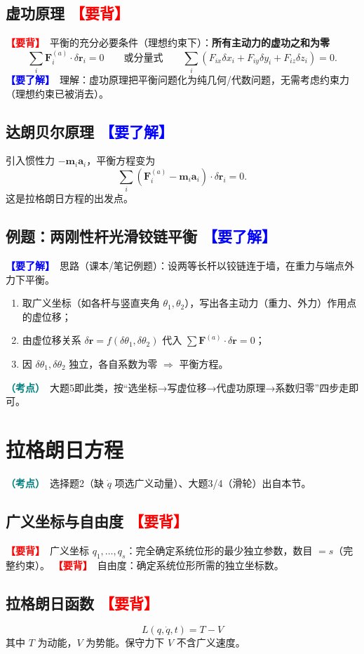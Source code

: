 \documentclass[UTF8,a4paper,11pt]{ctexart}
\newcommand{\bp}[1]{\textcolor{red}{\textbf{【要背】}}\ #1}
\newcommand{\uf}[1]{\textcolor{blue}{\textbf{【要了解】}}\ #1}
\newcommand{\imp}[1]{\textcolor{teal}{\textbf{（考点）}}\ #1}
\begin{document}
\subsection{虚功原理 \bp{}}
\bp{平衡的充分必要条件}（理想约束下）：\textbf{所有主动力的虚功之和为零}
\[
\boxed{\sum_i \bm F_i^{(a)}\cdot\delta\bm r_i=0}\qquad\text{或分量式}\qquad
\sum_i (F_{ix}\delta x_i+F_{iy}\delta y_i+F_{iz}\delta z_i)=0.
\]
\uf{理解}：虚功原理把平衡问题化为纯几何/代数问题，无需考虑约束力（理想约束已被消去）。

\subsection{达朗贝尔原理 \uf{}}
引入惯性力 $-\bm m_i\bm a_i$，平衡方程变为
\[
\sum_i (\bm F_i^{(a)}-\bm m_i\bm a_i)\cdot\delta\bm r_i=0.
\]
这是拉格朗日方程的出发点。

\subsection{例题：两刚性杆光滑铰链平衡 \uf{}}
\uf{思路}（课本/笔记例题）：设两等长杆以铰链连于墙，在重力与端点外力下平衡。
\begin{enumerate}[itemsep=2pt]
  \item 取广义坐标（如各杆与竖直夹角 $\theta_1,\theta_2$），写出各主动力（重力、外力）作用点的虚位移；
  \item 由虚位移关系 $\delta\bm r=f(\delta\theta_1,\delta\theta_2)$ 代入 $\sum\bm F^{(a)}\cdot\delta\bm r=0$；
  \item 因 $\delta\theta_1,\delta\theta_2$ 独立，各自系数为零 $\Rightarrow$ 平衡方程。
\end{enumerate}
\imp{大题5即此类，按“选坐标→写虚位移→代虚功原理→系数归零”四步走即可。}

\section{拉格朗日方程}
\imp{选择题2（缺 $\dot q$ 项选广义动量）、大题3/4（滑轮）出自本节。}

\subsection{广义坐标与自由度 \bp{}}
\bp{广义坐标} $q_1,\dots,q_s$：完全确定系统位形的最少独立参数，数目 $=s$（完整约束）。
\bp{自由度}：确定系统位形所需的独立坐标数。

\subsection{拉格朗日函数 \bp{}}
\[
\boxed{L(q,\dot q,t)=T-V}
\]
其中 $T$ 为动能，$V$ 为势能。保守力下 $V$ 不含广义速度。
\end{document}
